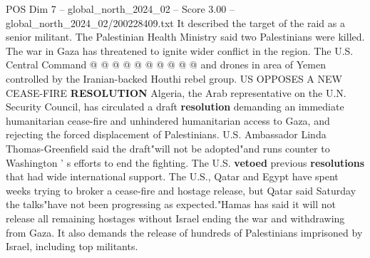 \begin{textsample}{POS Dim 7 – global\_north\_2024\_02 – Score 3.00 – global\_north\_2024\_02/200228409.txt}
It described the target of the raid as a senior militant.
The Palestinian Health Ministry said two Palestinians were killed.
The war in Gaza has threatened to ignite wider conflict in the region.
The U.S.
Central Command @ @ @ @ @ @ @ @ @ @ and drones in area of Yemen controlled by the Iranian-backed Houthi rebel group.
US OPPOSES A NEW CEASE-FIRE \textbf{RESOLUTION} Algeria, the Arab representative on the U.N.
Security Council, has circulated a draft \textbf{resolution} demanding an immediate humanitarian cease-fire and unhindered humanitarian access to Gaza, and rejecting the forced displacement of Palestinians.
U.S.
Ambassador Linda Thomas-Greenfield said the draft"will not be adopted"and runs counter to Washington ' s efforts to end the fighting.
The U.S. \textbf{vetoed} previous \textbf{resolutions} that had wide international support.
The U.S., Qatar and Egypt have spent weeks trying to broker a cease-fire and hostage release, but Qatar said Saturday the talks"have not been progressing as expected."Hamas has said it will not release all remaining hostages without Israel ending the war and withdrawing from Gaza.
It also demands the release of hundreds of Palestinians imprisoned by Israel, including top militants.

\end{textsample}
